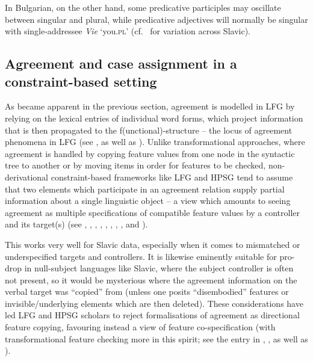 \documentclass[output=paper,hidelinks]{langscibook}
\begin{document}
In Bulgarian, on the other hand, some predicative participles may oscillate between singular and plural, while predicative adjectives will normally be singular with single-addressee \textit{Vie} `you.\textsc{pl}' (cf.\ \citealt[567]{SussexCubberley2006} for variation across Slavic).

\subsection{Agreement and case assignment in a constraint-based setting}
\label{sec:Slavic:2.3}

As became apparent in the previous section, agreement is modelled in
LFG by relying on the lexical entries of individual word forms, which
project information that is then propagated to the
f(unctional)-structure -- the locus of agreement phenomena in LFG
(see , as well as ).
Unlike transformational approaches, where agreement is handled by
copying feature values from one node in the syntactic tree to another
or by moving items in order for features to be checked,
non-derivational constraint-based frameworks like LFG and HPSG tend to
assume that two elements which participate in an agreement relation
supply partial information about a single linguistic object -- a view
which amounts to seeing agreement as multiple specifications of
compatible feature values by a controller and its target(s) (see
\citealt[237]{PollardSag1988}, \citealt[Chapter
  2]{pollard1994head-driven}, \citealt[Chapter 8]{bresnan2001lexical},
\citealt[Chapter 5]{dalrymple01}, \citealt[115]{corbett06},
\citealt{WechslerZlatic:Agreement2003}, \citealt[186]{DH:Agr},
\citealt[24ff]{Hristov2012}, and ). 

This works very well for Slavic data, especially when it comes to mismatched or underspecified targets and controllers. It is likewise eminently suitable for pro-drop in null-subject languages like Slavic, where the subject controller is often not present, so it would be mysterious where the agreement information on the verbal target was ``copied'' from (unless one posits ``disembodied'' features or invisible/underlying elements which are then deleted). These considerations have led LFG and HPSG scholars to reject formalisations of agreement as directional feature copying, favouring instead a view of feature co-specification (with transformational feature checking more in this spirit; see the entry in , , as well as ).
\end{document}
